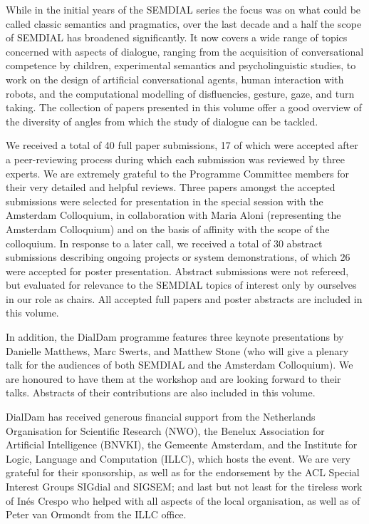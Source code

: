 \documentclass[a4paper,12pt,oneside]{book}
\begin{document}
\hspace*{20pt}
While in the  initial years of the SEMDIAL series the
focus was on what could be called classic semantics and
pragmatics, over the last decade and a half the scope of SEMDIAL has broadened
significantly. It now covers a wide range of topics concerned with
 aspects of dialogue, ranging from the acquisition of
conversational competence by children, experimental semantics and
psycholinguistic studies, to work on the design of
artificial conversational agents, human interaction with robots, and
the computational modelling of disfluencies, gesture, gaze, and
turn taking. The collection of papers presented in this volume offer a
good overview of the diversity of angles from which the study of
dialogue can be tackled. 

\hspace*{20pt}
We received a total of 40 full paper submissions,  17 of which were
accepted after a peer-reviewing process during which each submission
was reviewed by three experts. We are extremely 
grateful to the Programme Committee members for their very detailed
and helpful reviews. Three papers amongst the accepted
submissions were selected for presentation in the special session with
the Amsterdam Colloquium, in collaboration with Maria Aloni
(representing the Amsterdam Colloquium) and on the
basis of affinity with the scope of the colloquium. 
In response to a later call, we received a total of 30 abstract
submissions describing ongoing projects or system demonstrations, of
which 26 were accepted for poster presentation. Abstract submissions were not refereed, but evaluated for
relevance to the SEMDIAL topics of interest only by ourselves in our role as chairs. All accepted full
papers and poster abstracts are included in this volume.

\hspace*{20pt}
In addition, the DialDam programme features three keynote
presentations by Danielle Matthews,  Marc Swerts, and Matthew Stone (who will give a
plenary talk for the audiences of both SEMDIAL and the Amsterdam
Colloquium). We are honoured to have them at the
workshop and are looking forward to their talks. Abstracts of their
contributions are also included in this volume.

\hspace*{20pt}
DialDam has received generous financial support from the Netherlands
Organisation for Scientific Research (NWO), the Benelux Association for
Artificial Intelligence (BNVKI), the Gemeente Amsterdam, and the Institute for
Logic, Language and Computation (ILLC), which hosts the event. We are
very grateful for their sponsorship, as well as for the endorsement by the
ACL Special Interest Groups SIGdial and SIGSEM; and last but not least
for the tireless work of In\'es Crespo who helped with all aspects of
the local organisation, as well as of Peter van Ormondt from the ILLC office. 
\end{document}
